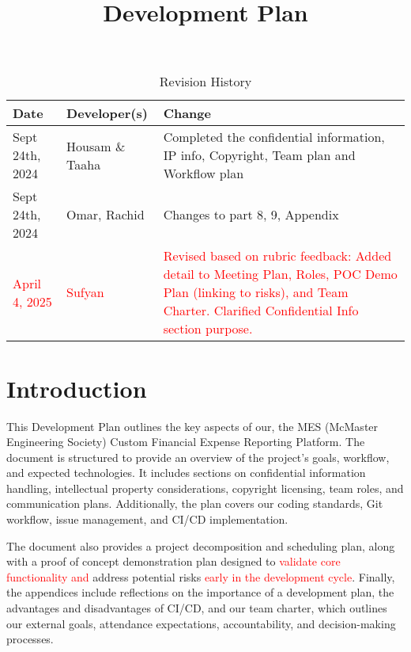 \documentclass{article}
\title{Development Plan\\\progname}
\author{\authname}
\date{}
\begin{document}
\maketitle

\begin{table}[hp]
\caption{Revision History} \label{TblRevisionHistory}
\begin{tabularx}{\textwidth}{llX}
\toprule
\textbf{Date} & \textbf{Developer(s)} & \textbf{Change}\\
\midrule
Sept 24th, 2024 & Housam \& Taaha & Completed the confidential information, IP info, Copyright, Team plan and Workflow plan \\
Sept 24th, 2024 & Omar, Rachid & Changes to part 8, 9, Appendix\\
\textcolor{red}{April 4, 2025} & \textcolor{red}{Sufyan} & \textcolor{red}{Revised based on rubric feedback: Added detail to Meeting Plan, Roles, POC Demo Plan (linking to risks), and Team Charter. Clarified Confidential Info section purpose.} \\
\bottomrule
\end{tabularx}
\end{table}

\newpage{}

\section*{Introduction}

This Development Plan outlines the key aspects of our, the MES (McMaster Engineering Society) Custom Financial Expense Reporting Platform. The document is structured to provide an overview of the project's goals, workflow, and expected technologies. It includes sections on confidential information handling, intellectual property considerations, copyright licensing, team roles, and communication plans. Additionally, the plan covers our coding standards, Git workflow, issue management, and CI/CD implementation.

The document also provides a project decomposition and scheduling plan, along with a proof of concept demonstration plan designed to \textcolor{red}{validate core functionality and} address potential risks \textcolor{red}{early in the development cycle}. Finally, the appendices include reflections on the importance of a development plan, the advantages and disadvantages of CI/CD, and our team charter, which outlines our external goals, attendance expectations, accountability, and decision-making processes.
\end{document}
